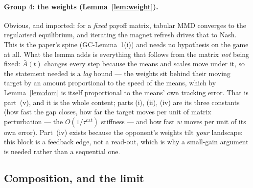 \documentclass[11pt]{article}
\theoremstyle{definition}
\newcommand{\GC}[1]{\textsf{GC-#1}}
\begin{document}
\paragraph{Group 4: the weights (Lemma~\ref{lem:weight}).}
\begin{description}[leftmargin=0pt, style=unboxed, font=\normalfont\itshape]
\item[Lemma~\ref{lem:weight}.] Obvious, and imported: for a \emph{fixed} payoff
  matrix, tabular MMD converges to the regularised equilibrium, and iterating the
  magnet refresh drives that to Nash. This is the paper's spine (\GC{Lemma~1}(i))
  and needs no hypothesis on the game at all. What the lemma adds is everything
  that follows from the matrix \emph{not} being fixed: $\bar A(t)$ changes every
  step because the means and scales move under it, so the statement needed is a
  \emph{lag} bound --- the weights sit behind their moving target by an amount
  proportional to the speed of the means, which by Lemma~\ref{lem:dom} is itself
  proportional to the means' own tracking error. That is part~(v), and it is the
  whole content; parts (i), (ii), (iv) are its three constants (how fast the gap
  closes, how far the target moves per unit of matrix perturbation --- the
  $O(1/\tau^{\mathrm{cat}})$ stiffness --- and how fast $w$ moves per unit of its
  own error). Part~(iv) exists because the opponent's weights tilt \emph{your}
  landscape: this block is a feedback edge, not a read-out, which is why a
  small-gain argument is needed rather than a sequential one.
\end{description}

\subsection*{Composition, and the limit}
\end{document}
